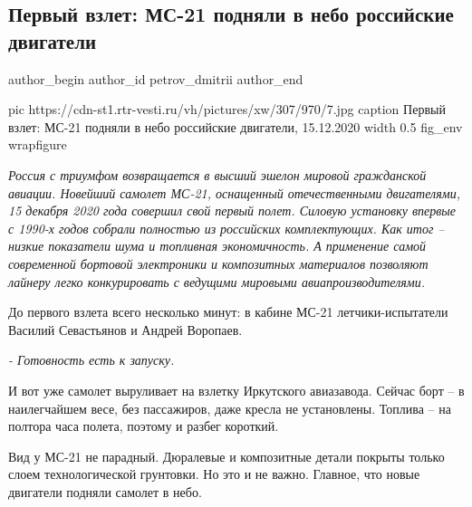  
 
 
 
 
 
\subsection{Первый взлет: МС-21 подняли в небо российские двигатели}
\label{sec:15_12_2020.news.ru.vesti.petrov_dmitrii.1.mc21_pervyj_vzlet}
\ifcmt
	author_begin
   author_id petrov_dmitrii
	author_end
\fi


\ifcmt
  pic https://cdn-st1.rtr-vesti.ru/vh/pictures/xw/307/970/7.jpg
  caption Первый взлет: МС-21 подняли в небо российские двигатели, 15.12.2020
  width 0.5
  fig_env wrapfigure
\fi

\emph{Россия с триумфом возвращается в высший эшелон мировой гражданской авиации.
Новейший самолет МС-21, оснащенный отечественными двигателями, 15 декабря 2020
года совершил свой первый полет. Силовую установку впервые с 1990-х годов
собрали полностью из российских комплектующих. Как итог – низкие показатели
шума и топливная экономичность. А применение самой современной бортовой
электроники и композитных материалов позволяют лайнеру легко конкурировать с
ведущими мировыми авиапроизводителями.}

До первого взлета всего несколько минут: в кабине МС-21 летчики-испытатели Василий Севастьянов и Андрей Воропаев.

\emph{- Готовность есть к запуску.}

И вот уже самолет выруливает на взлетку Иркутского авиазавода. Сейчас борт – в наилегчайшем весе, без пассажиров, даже кресла не установлены. Топлива – на полтора часа полета, поэтому и разбег короткий.

Вид у МС-21 не парадный. Дюралевые и композитные детали покрыты только слоем технологической грунтовки. Но это и не важно. Главное, что новые двигатели подняли самолет в небо.

